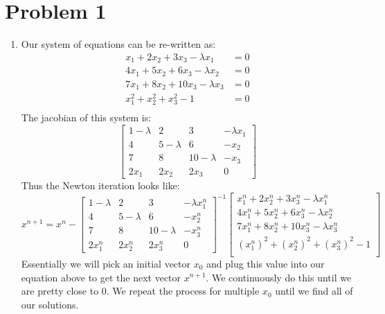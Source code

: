 \documentclass{article}
\title{\thetitle}
\author{\theauthor}
\begin{document}
\maketitle
\section*{Problem 1}
\begin{enumerate}[label=\alph*.)]
\item
Our system of equations can be re-written as:\\
\begin{align*}
x_1 + 2x_2 + 3x_3 - \lambda x_1 &= 0 \\
4x_1 + 5x_2 + 6x_3 - \lambda x_2 &= 0 \\
7x_1 + 8x_2 + 10x_3 - \lambda x_3 &= 0 \\
x_1^2 + x_2^2 + x_3^2 - 1 &= 0\\
\end{align*}
The jacobian of this system is:\\
\[
\begin{bmatrix}
1 -\lambda & 2 & 3 & -\lambda x_1 \\
4 & 5 - \lambda & 6 & -x_2 \\
7 & 8 & 10 - \lambda & -x_3 \\
2x_1 & 2x_2 & 2x_3 & 0
\end{bmatrix}
\] 
Thus the Newton iteration looks like: \\
\[
x^{n+1} = x^n - \begin{bmatrix}
1 -\lambda & 2 & 3 & -\lambda x^n_1 \\
4 & 5 - \lambda & 6 & -x^n_2 \\
7 & 8 & 10 - \lambda & -x^n_3 \\
2x^n_1 & 2x^n_2 & 2x^n_3 & 0
\end{bmatrix}^{-1}\begin{bmatrix}
x^n_1 + 2x^n_2 + 3x^n_3 - \lambda x^n_1 \\
4x^n_1 + 5x^n_2 + 6x^n_3 - \lambda x^n_2 \\
7x^n_1 + 8x^n_2 + 10x^n_3 - \lambda x^n_3\\
(x^n_1)^2 + (x^n_2)^2 + (x^n_3)^2 - 1\\
\end{bmatrix}
\]
Essentially we will pick an initial vector $x_0$ and plug this value into our equation above to get the next vector $x^{n+1}$. We continuously do this until we are pretty close to 0. We repeat the process for multiple $x_0$ until we find all of our solutions. \\

\end{enumerate}
\end{document}
